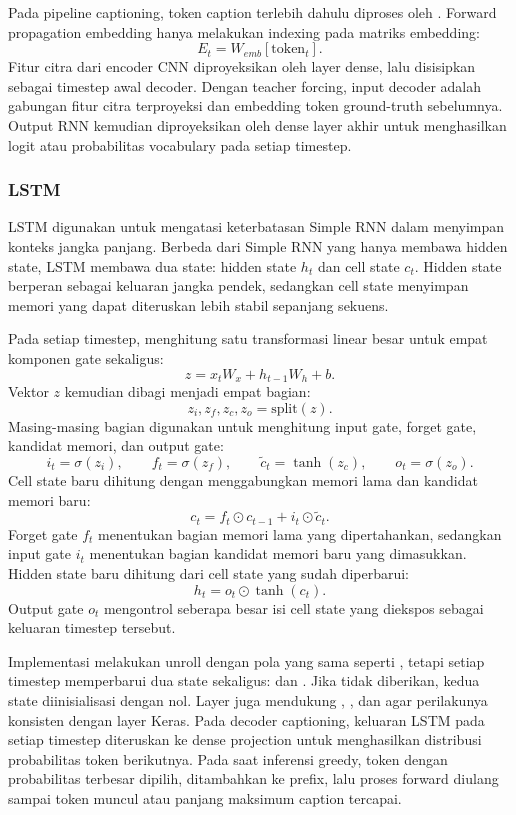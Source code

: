 Pada pipeline captioning, token caption terlebih dahulu diproses oleh
. Forward propagation embedding hanya melakukan indexing pada
matriks embedding:
\[
E_t = W_{emb}[\text{token}_t].
\]
Fitur citra dari encoder CNN diproyeksikan oleh layer dense, lalu disisipkan
sebagai timestep awal decoder. Dengan teacher forcing, input decoder adalah
gabungan fitur citra terproyeksi dan embedding token ground-truth sebelumnya.
Output RNN kemudian diproyeksikan oleh dense layer akhir untuk menghasilkan
logit atau probabilitas vocabulary pada setiap timestep.

\subsubsection{LSTM}
LSTM digunakan untuk mengatasi keterbatasan Simple RNN dalam menyimpan konteks
jangka panjang. Berbeda dari Simple RNN yang hanya membawa hidden state, LSTM
membawa dua state: hidden state $h_t$ dan cell state $c_t$. Hidden state
berperan sebagai keluaran jangka pendek, sedangkan cell state menyimpan memori
yang dapat diteruskan lebih stabil sepanjang sekuens.

Pada setiap timestep,  menghitung satu transformasi linear besar
untuk empat komponen gate sekaligus:
\[
z = x_t W_x + h_{t-1} W_h + b.
\]
Vektor $z$ kemudian dibagi menjadi empat bagian:
\[
z_i, z_f, z_c, z_o = \text{split}(z).
\]
Masing-masing bagian digunakan untuk menghitung input gate, forget gate,
kandidat memori, dan output gate:
\[
i_t = \sigma(z_i),
\qquad
f_t = \sigma(z_f),
\qquad
\tilde{c}_t = \tanh(z_c),
\qquad
o_t = \sigma(z_o).
\]
Cell state baru dihitung dengan menggabungkan memori lama dan kandidat memori
baru:
\[
c_t = f_t \odot c_{t-1} + i_t \odot \tilde{c}_t.
\]
Forget gate $f_t$ menentukan bagian memori lama yang dipertahankan, sedangkan
input gate $i_t$ menentukan bagian kandidat memori baru yang dimasukkan.
Hidden state baru dihitung dari cell state yang sudah diperbarui:
\[
h_t = o_t \odot \tanh(c_t).
\]
Output gate $o_t$ mengontrol seberapa besar isi cell state yang diekspos sebagai
keluaran timestep tersebut.

Implementasi  melakukan unroll dengan pola yang sama seperti
, tetapi setiap timestep memperbarui dua state sekaligus:
 dan . Jika  tidak diberikan, kedua
state diinisialisasi dengan nol. Layer juga mendukung ,
, dan  agar perilakunya konsisten dengan
layer Keras. Pada decoder captioning, keluaran LSTM pada setiap timestep
diteruskan ke dense projection untuk menghasilkan distribusi probabilitas token
berikutnya. Pada saat inferensi greedy, token dengan probabilitas terbesar
dipilih, ditambahkan ke prefix, lalu proses forward diulang sampai token
 muncul atau panjang maksimum caption tercapai.
